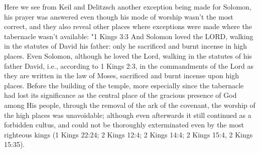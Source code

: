 \documentclass[11pt]{article}
\begin{document}
%
%

Here we see from Keil and Delitzsch another exception being made for Solomon, his prayer was answered even though his mode of worship wasn't the most correct, and they also reveal other places where exceptions were made where the tabernacle wasn't available:
"1 Kings 3:3
And Solomon loved the LORD, walking in the statutes of David his father: only he sacrificed and burnt incense in high places.
Even Solomon, although he loved the Lord, walking in the statutes of his father David, i.e., according to 1 Kings 2:3, in the commandments of the Lord as they are written in the law of Moses, sacrificed and burnt incense upon high places. Before the building of the temple, more especially since the tabernacle had lost its significance as the central place of the gracious presence of God among His people, through the removal of the ark of the covenant, the worship of the high places was unavoidable; although even afterwards it still continued as a forbidden cultus, and could not be thoroughly exterminated even by the most righteous kings (1 Kings 22:24; 2 Kings 12:4; 2 Kings 14:4; 2 Kings 15:4, 2 Kings 15:35). \newline
\end{document}

